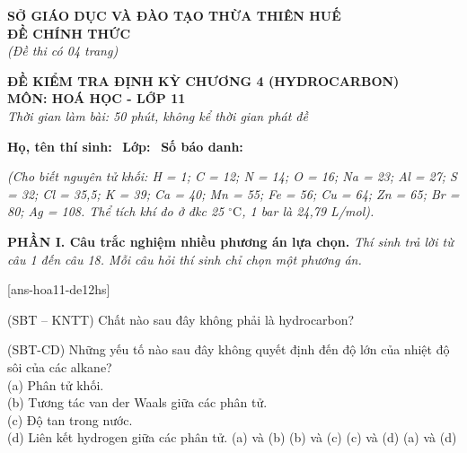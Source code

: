 \documentclass[12pt,a4paper]{article}
\begin{document}
\thispagestyle{firstpage}

\noindent
\begin{minipage}[t]{0.44\textwidth}
	\centering\fontsize{10pt}{12pt}\selectfont
	\textbf{SỞ GIÁO DỤC VÀ ĐÀO TẠO THỪA THIÊN HUẾ}\\
	\textbf{ĐỀ CHÍNH THỨC}\\
	\textit{(Đề thi có 04 trang)}
\end{minipage}\hfill
\begin{minipage}[t]{0.54\textwidth}
	\centering\fontsize{10.5pt}{13pt}\selectfont
	\textbf{ĐỀ KIỂM TRA ĐỊNH KỲ CHƯƠNG 4 (HYDROCARBON)}\\
	\textbf{MÔN: HOÁ HỌC - LỚP 11}\\
	\textit{Thời gian làm bài: 50 phút, không kể thời gian phát đề}
	
	\smallskip
\end{minipage}

\smallskip
\noindent\hrulefill
\smallskip

\noindent\textbf{Họ, tên thí sinh:} \dotfill\ \textbf{Lớp:} \dotfill\ \textbf{Số báo danh:} \dotfill

\smallskip
\noindent\textit{(Cho biết nguyên tử khối: H = 1; C = 12; N = 14; O = 16; Na = 23; Al = 27; S = 32; Cl = 35,5; K = 39; Ca = 40; Mn = 55; Fe = 56; Cu = 64; Zn = 65; Br = 80; Ag = 108. Thể tích khí đo ở đkc 25 $^\circ\text{C}$, 1 bar là 24,79 L/mol).}
\smallskip

\noindent\textbf{\large PHẦN I. Câu trắc nghiệm nhiều phương án lựa chọn.}
\textit{Thí sinh trả lời từ câu 1 đến câu 18. Mỗi câu hỏi thí sinh chỉ chọn một phương án.}
\vspace{0.2cm}

[ans-hoa11-de12hs]

\begin{ex}
(SBT -- KNTT) Chất nào sau đây không phải là hydrocarbon?
\choice
{}
{}
{}
{\True {}}
\end{ex}

\begin{ex}
(SBT-CD) Những yếu tố nào sau đây không quyết định đến độ lớn của nhiệt độ sôi của các alkane?\\
(a) Phân tử khối.\\
(b) Tương tác van der Waals giữa các phân tử.\\
(c) Độ tan trong nước.\\
(d) Liên kết hydrogen giữa các phân tử.
\choice
{(a) và (b)}
{(b) và (c)}
{\True (c) và (d)}
{(a) và (d)}
\end{ex}
\end{document}

